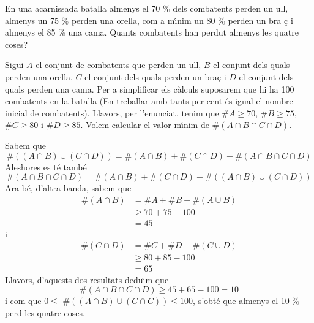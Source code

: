 \begin{exer}
En una acarnissada batalla almenys el 70 \% dels combatents perden un ull,
almenys un 75 \% perden una orella, com a m\'{\i}nim un 80 \% perden un bra%
\c{c} i almenys el 85 \% una cama. Quants combatents han perdut almenys les
quatre coses?
\end{exer}

\begin{solucio}
Sigui $A$ el conjunt de combatents que perden un ull, $B$ el conjunt dels
quals perden una orella, $C$ el conjunt dels quals perden un bra\c{c} i $D$
el conjunt dels quals perden una cama. Per a simplificar els c\`{a}lculs
suposarem que hi ha 100 combatents en la batalla (En treballar amb tants per
cent \'{e}s igual el nombre inicial de combatents). Llavors, per l'enunciat,
tenim que $\#A\geq 70$, $\#B\geq 75$, $\#C\geq 80$ i $\#D\geq 85$. Volem
calcular el valor m\'{\i}nim de $\#\left( A\cap B\cap C\cap D\right) $.

Sabem que%
\begin{equation*}
\#\left( \left( A\cap B\right) \cup \left( C\cap D\right) \right) =\#\left(
A\cap B\right) +\#\left( C\cap D\right) -\#\left( A\cap B\cap C\cap D\right)
\end{equation*}%
Aleshores es t\'{e} tamb\'{e}%
\begin{equation*}
\#\left( A\cap B\cap C\cap D\right) =\#\left( A\cap B\right) +\#\left( C\cap
D\right) -\#\left( \left( A\cap B\right) \cup \left( C\cap D\right) \right)
\end{equation*}%
Ara b\'{e}, d'altra banda, sabem que%
\begin{align*}
\#\left( A\cap B\right) & =\#A+\#B-\#\left( A\cup B\right) \\
& \geq 70+75-100 \\
& =45
\end{align*}%
i%
\begin{align*}
\#\left( C\cap D\right) & =\#C+\#D-\#\left( C\cup D\right) \\
& \geq 80+85-100 \\
& =65
\end{align*}%
Llavors, d'aquests dos resultats dedu\"{\i}m que%
\begin{equation*}
\#\left( A\cap B\cap C\cap D\right) \geq 45+65-100=10
\end{equation*}%
i com que $0\leq $ $\#\left( \left( A\cap B\right) \cup \left( C\cap
C\right) \right) \leq 100$, s'obt\'{e} que almenys el 10 \% perd les quatre
coses.
\end{solucio}

